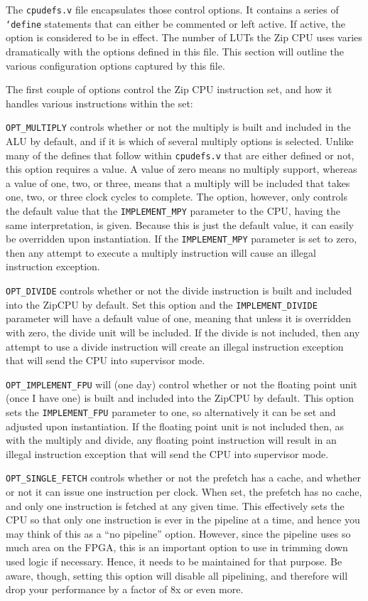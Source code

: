 \documentclass{gqtekspec}
\begin{document}
The {\tt cpudefs.v} file encapsulates those control options.  It contains a 
series of {\tt `define} statements that can either be commented or left
active.  If active, the option is considered to be in effect.  The number of
LUTs the Zip CPU uses varies dramatically with the options defined in this file.
This section will outline the various configuration options captured by this
file.

The first couple of options control the Zip CPU instruction set, and how
it handles various instructions within the set:


{\tt OPT\_MULTIPLY} controls whether or not the multiply is built and included
in the ALU by default, and if it is which of several multiply options is 
selected.  Unlike many of the defines that follow within {\tt cpudefs.v} that
are either defined or not, this option requires a value.  A value of zero means
no multiply support, whereas a value of one, two, or three, means that a
multiply will be included that takes one, two, or three clock cycles to
complete.  The option, however, only controls the default value that the
{\tt IMPLEMENT\_MPY} parameter to the CPU, having the same interpretation, is
given.  Because this is just the default value, it can easily be overridden
upon instantiation.  If the {\tt IMPLEMENT\_MPY} parameter is set to zero,
then any attempt to execute a multiply instruction will cause an illegal
instruction exception.

{\tt OPT\_DIVIDE} controls whether or not the divide instruction is built and
included into the ZipCPU by default.  Set this option and the
{\tt IMPLEMENT\_DIVIDE} parameter will have a default value of one, meaning that
unless it is overridden with zero, the divide unit will be included.    If the
divide is not included, then any attempt to use a divide instruction will
create an illegal instruction exception that will send the CPU into supervisor
mode.

{\tt OPT\_IMPLEMENT\_FPU} will (one day) control whether or not the floating
point unit (once I have one) is built and included into the ZipCPU by default.
This option sets the {\tt IMPLEMENT\_FPU} parameter to one, so alternatively
it can be set and adjusted upon instantiation.  If the floating point unit is
not included then, as with the multiply and divide, any floating point
instruction will result in an illegal instruction exception that will send the
CPU into supervisor mode.

{\tt OPT\_SINGLE\_FETCH} controls whether or not the prefetch has a cache, and 
whether or not it can issue one instruction per clock.  When set, the
prefetch has no cache, and only one instruction is fetched at any given time.
This effectively sets the CPU so that only one instruction is ever 
in the pipeline at a time, and hence you may think of this as a ``no 
pipeline'' option.  However, since the pipeline uses so much area on the FPGA,
this is an important option to use in trimming down used logic if necessary. 
Hence, it needs to be maintained for that purpose.  Be aware, though, setting
this option will disable all pipelining, and therefore will drop your
performance by a factor of 8x or even more.
\end{document}

